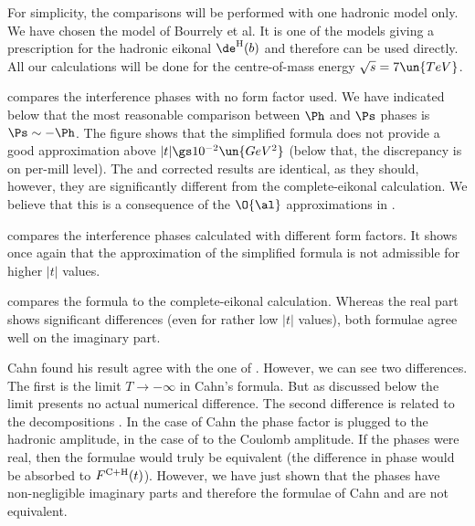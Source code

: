 For simplicity, the comparisons will be performed with one hadronic model only. We have chosen the model of Bourrely et al. It is one of the models giving a prescription for the hadronic eikonal $\de^{\rm H}(b)$ and therefore  can be used directly. All our calculations will be done for the centre-of-mass energy $\sqrt s = 7\un{TeV}$.

 compares the interference phases with no form factor used. We have indicated below  that the most reasonable comparison between $\Ph$ and $\Ps$ phases is $\Ps \sim - \Ph$. The figure shows that the simplified \WY{} formula does not provide a good approximation above $|t| \gs 10^{-2}\un{GeV^2}$ (below that, the discrepancy is on per-mill level). The \WY{} and corrected \KL{} results are identical, as they should, however, they are significantly different from the complete-eikonal calculation. We believe that this is a consequence of the $\O{\al}$ approximations in .







 compares the interference phases calculated with different form factors. It shows once again that the approximation of the simplified \WaY{} formula is not admissible for higher $|t|$ values.

 compares the \KL{} formula to the complete-eikonal calculation. Whereas the real part shows significant differences (even for rather low $|t|$ values), both formulae agree well on the imaginary part.

Cahn found his result  agree with the one of \WY{} . However, we can see two differences. The first is the limit $T\to -\infty$ in Cahn's formula. But as discussed below  the limit presents no actual numerical difference. The second difference is related to the decompositions . In the case of Cahn the phase factor is plugged to the hadronic amplitude, in the case of \WaY{} to the Coulomb amplitude. If the phases were real, then the formulae would truly be equivalent (the difference in phase would be absorbed to $F^{\rm C+H}(t)$). However, we have just shown that the phases have non-negligible imaginary parts and therefore the formulae of Cahn  and \WY{}  are not equivalent.

